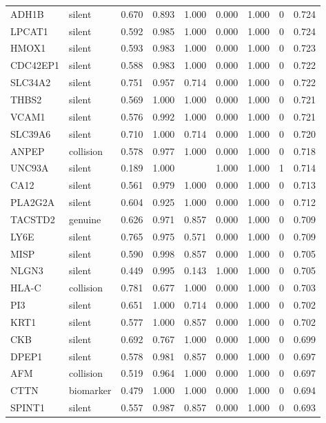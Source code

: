 \begin{longtable}{llrrrrrrr}
ADH1B & silent & 0.670 & 0.893 & 1.000 & 0.000 & 1.000 & 0 & 0.724\\
LPCAT1 & silent & 0.592 & 0.985 & 1.000 & 0.000 & 1.000 & 0 & 0.724\\
HMOX1 & silent & 0.593 & 0.983 & 1.000 & 0.000 & 1.000 & 0 & 0.723\\
CDC42EP1 & silent & 0.588 & 0.983 & 1.000 & 0.000 & 1.000 & 0 & 0.722\\
SLC34A2 & silent & 0.751 & 0.957 & 0.714 & 0.000 & 1.000 & 0 & 0.722\\
THBS2 & silent & 0.569 & 1.000 & 1.000 & 0.000 & 1.000 & 0 & 0.721\\
VCAM1 & silent & 0.576 & 0.992 & 1.000 & 0.000 & 1.000 & 0 & 0.721\\
SLC39A6 & silent & 0.710 & 1.000 & 0.714 & 0.000 & 1.000 & 0 & 0.720\\
ANPEP & collision & 0.578 & 0.977 & 1.000 & 0.000 & 1.000 & 0 & 0.718\\
UNC93A & silent & 0.189 & 1.000 &  & 1.000 & 1.000 & 1 & 0.714\\
CA12 & silent & 0.561 & 0.979 & 1.000 & 0.000 & 1.000 & 0 & 0.713\\
PLA2G2A & silent & 0.604 & 0.925 & 1.000 & 0.000 & 1.000 & 0 & 0.712\\
TACSTD2 & genuine & 0.626 & 0.971 & 0.857 & 0.000 & 1.000 & 0 & 0.709\\
LY6E & silent & 0.765 & 0.975 & 0.571 & 0.000 & 1.000 & 0 & 0.709\\
MISP & silent & 0.590 & 0.998 & 0.857 & 0.000 & 1.000 & 0 & 0.705\\
NLGN3 & silent & 0.449 & 0.995 & 0.143 & 1.000 & 1.000 & 0 & 0.705\\
HLA-C & collision & 0.781 & 0.677 & 1.000 & 0.000 & 1.000 & 0 & 0.703\\
PI3 & silent & 0.651 & 1.000 & 0.714 & 0.000 & 1.000 & 0 & 0.702\\
KRT1 & silent & 0.577 & 1.000 & 0.857 & 0.000 & 1.000 & 0 & 0.702\\
CKB & silent & 0.692 & 0.767 & 1.000 & 0.000 & 1.000 & 0 & 0.699\\
DPEP1 & silent & 0.578 & 0.981 & 0.857 & 0.000 & 1.000 & 0 & 0.697\\
AFM & collision & 0.519 & 0.964 & 1.000 & 0.000 & 1.000 & 0 & 0.697\\
CTTN & biomarker & 0.479 & 1.000 & 1.000 & 0.000 & 1.000 & 0 & 0.694\\
SPINT1 & silent & 0.557 & 0.987 & 0.857 & 0.000 & 1.000 & 0 & 0.693\\

\end{longtable}
